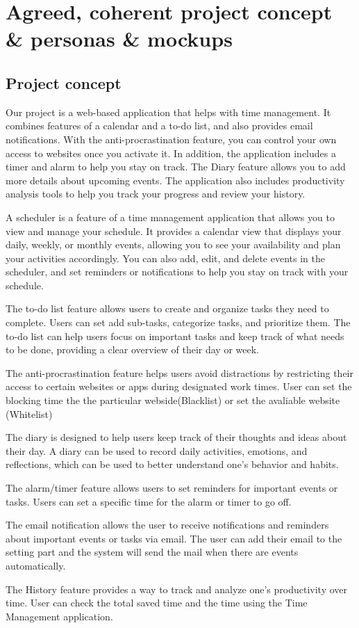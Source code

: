 \documentclass[a4paper]{article}
\begin{document}
{\newpage

\section{Agreed, coherent project concept \& personas \& mockups}

\subsection{Project concept}

Our project is a web-based application that helps with time management. It combines features of a calendar and a to-do list, and also provides email notifications. With the anti-procrastination feature, you can control your own access to websites once you activate it. In addition, the application includes a timer and alarm to help you stay on track. The Diary feature allows you to add more details about upcoming events. The application also includes productivity analysis tools to help you track your progress and review your history.
\par
A scheduler is a feature of a time management application that allows you to view and manage your schedule. It provides a calendar view that displays your daily, weekly, or monthly events, allowing you to see your availability and plan your activities accordingly. You can also add, edit, and delete events in the scheduler, and set reminders or notifications to help you stay on track with your schedule.
\par
The to-do list feature allows users to create and organize tasks they need to complete. Users can set add sub-tasks, categorize tasks, and prioritize them. The to-do list can help users focus on important tasks and keep track of what needs to be done, providing a clear overview of their day or week.
\par
The anti-procrastination feature helps users avoid distractions by restricting their access to certain websites or apps during designated work times. User can set the blocking time the the particular webside(Blacklist) or set the avaliable website (Whitelist)
\par
The diary is designed to help users keep track of their thoughts and ideas about their day.  A diary can be used to record daily activities, emotions, and reflections, which can be used to better understand one's behavior and habits.
\par
The alarm/timer feature allows users to set reminders for important events or tasks. Users can set a specific time for the alarm or timer to go off.
\par
The email notification allows the user to receive notifications and reminders about important events or tasks via email. The user can add their email to the setting part and the system will send the mail when there are events automatically.
\par
The History feature provides a way to track and analyze one's productivity over time. User can check the total saved time and the time using the Time Management application.

}
\end{document}
